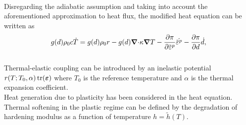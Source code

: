 \begin{frame}{}
 \\
Disregarding the adiabatic assumption and taking into account the aforementioned approximation to heat flux, the modified heat equation can be written as
\begin{align}
    g(d) \rho_0 c \dot{T} = g(d) \rho_0 r - g(d) \divergence \kappa \grad T - \dfrac{\partial \pi}{\partial \plasticstrain}\dot{\plasticstrain} - \dfrac{\partial \pi}{\partial d} \dot{d},
\end{align}\\
\bigskip
Thermal-elastic coupling can be introduced by an inelastic potential $r(T;T_0,\alpha) \operatorname{tr}(\boldsymbol{\varepsilon})$ where $T_0$ is the reference temperature and $\alpha$ is the thermal expansion coefficient. \\
\bigskip
Heat generation due to plasticity has been considered in the heat equation. Thermal softening in the plastic regime can be defined by the degradation of hardening modulus as a function of temperature $h = \widetilde{h}(T)$.
\end{frame}
